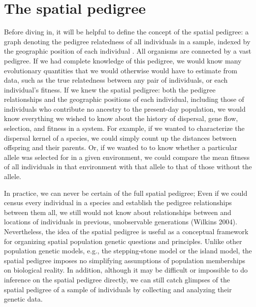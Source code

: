 \documentclass{ar-1col}
\begin{document}
\section{The spatial pedigree}
Before diving in, 
it will be helpful to define the concept of the spatial pedigree: 
a graph denoting the pedigree relatedness of all individuals in a sample, 
indexed by the geographic position of each individual .
All organisms are connected by a vast pedigree. 
If we had complete knowledge of this pedigree, 
we would know many evolutionary quantities 
that we would otherwise would have to estimate from data, 
such as the true relatedness between any pair of individuals, 
or each individual's fitness.
If we knew the spatial pedigree:
both the pedigree relationships 
and the geographic positions of each individual, 
including those of individuals 
who contribute no ancestry to the present-day population, 
we would know everything we wished to know about 
the history of dispersal, gene flow, 
selection, and fitness in a system.
For example, if we wanted to characterize the dispersal kernel of a species, 
we could simply count up the distances between offspring and their parents.
Or, if we wanted to to know whether a particular allele 
was selected for in a given environment, 
we could compare the mean fitness of all individuals in that environment with that allele 
to that of those without the allele.

In practice, we can never be certain of the full spatial pedigree;
Even if we could census every individual in a species 
and establish the pedigree relationships between them all, 
we still would not know about relationships between 
and locations of individuals in previous, unobservable generations (Wilkins 2004).
Nevertheless, the idea of the spatial pedigree is useful
as a conceptual framework for organizing 
spatial population genetic questions and principles.
Unlike other population genetic models, 
e.g., the stepping-stone model or the island model,
the spatial pedigree imposes no simplifying 
assumptions of population memberships on biological reality.
In addition, although it may be difficult or impossible 
to do inference on the spatial pedigree directly, 
we can still catch glimpses of the spatial pedigree of a sample of individuals 
by collecting and analyzing their genetic data.
\end{document}
